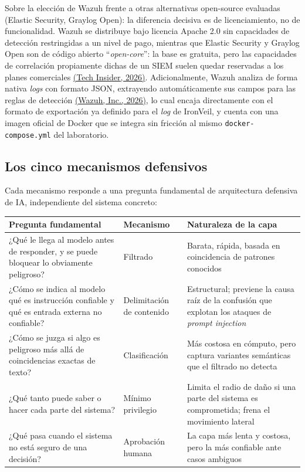 \documentclass[11pt,letterpaper]{article}
\newcommand{\citeapa}[2]{\hyperlink{#1}{#2}}
\begin{document}
Sobre la elección de Wazuh frente a otras alternativas open-source evaluadas (Elastic Security, Graylog Open): la diferencia decisiva es de licenciamiento, no de funcionalidad. Wazuh se distribuye bajo licencia Apache 2.0 sin capacidades de detección restringidas a un nivel de pago, mientras que Elastic Security y Graylog Open son de código abierto ``\emph{open-core}'': la base es gratuita, pero las capacidades de correlación propiamente dichas de un SIEM suelen quedar reservadas a los planes comerciales \citeapa{techinsider2026}{(Tech Insider, 2026)}. Adicionalmente, Wazuh analiza de forma nativa \emph{logs} con formato JSON, extrayendo automáticamente sus campos para las reglas de detección \citeapa{wazuhdocs2026}{(Wazuh, Inc., 2026)}, lo cual encaja directamente con el formato de exportación ya definido para el \emph{log} de IronVeil, y cuenta con una imagen oficial de Docker que se integra sin fricción al mismo \texttt{docker-compose.yml} del laboratorio.

\subsection{Los cinco mecanismos defensivos}

Cada mecanismo responde a una pregunta fundamental de arquitectura defensiva de IA, independiente del sistema concreto:

\begin{center}
\small
\begin{tabular}{@{}p{4.4cm}p{2.6cm}p{6.4cm}@{}}
\toprule
\textbf{Pregunta fundamental} & \textbf{Mecanismo} & \textbf{Naturaleza de la capa} \\
\midrule
¿Qué le llega al modelo antes de responder, y se puede bloquear lo obviamente peligroso? & Filtrado & Barata, rápida, basada en coincidencia de patrones conocidos \\
¿Cómo se indica al modelo qué es instrucción confiable y qué es entrada externa no confiable? & Delimitación de contenido & Estructural; previene la causa raíz de la confusión que explotan los ataques de \emph{prompt injection} \\
¿Cómo se juzga si algo es peligroso más allá de coincidencias exactas de texto? & Clasificación & Más costosa en cómputo, pero captura variantes semánticas que el filtrado no detecta \\
¿Qué tanto puede saber o hacer cada parte del sistema? & Mínimo privilegio & Limita el radio de daño si una parte del sistema es comprometida; frena el movimiento lateral \\
¿Qué pasa cuando el sistema no está seguro de una decisión? & Aprobación humana & La capa más lenta y costosa, pero la más confiable ante casos ambiguos \\
\bottomrule
\end{tabular}
\end{center}
\end{document}
